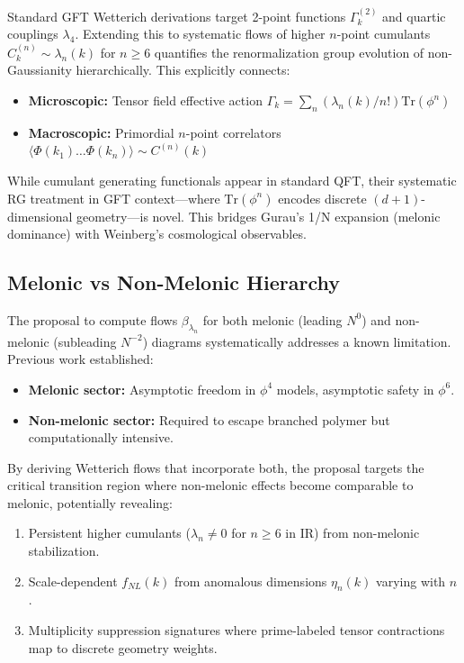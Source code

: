 \documentclass[12pt,a4paper]{article}
\begin{document}
Standard GFT Wetterich derivations target 2-point functions \(\Gamma_k^{(2)}\) and quartic couplings \(\lambda_4\). Extending this to systematic flows of higher \(n\)-point cumulants \(C_k^{(n)} \sim \lambda_n(k)\) for \(n \geq 6\) quantifies the renormalization group evolution of non-Gaussianity hierarchically. This explicitly connects:

\begin{itemize}
\item \textbf{Microscopic:} Tensor field effective action \(\Gamma_k = \sum_n (\lambda_n(k)/n!) \text{Tr}(\phi^n)\)
\item \textbf{Macroscopic:} Primordial \(n\)-point correlators \(\langle \Phi(k_1) \ldots \Phi(k_n) \rangle \sim C^{(n)}(k)\)
\end{itemize}

While cumulant generating functionals appear in standard QFT, their systematic RG treatment in GFT context—where \(\text{Tr}(\phi^n)\) encodes discrete \((d+1)\)-dimensional geometry—is novel. This bridges Gurau's 1/N expansion (melonic dominance) with Weinberg's cosmological observables.

\subsection{Melonic vs Non-Melonic Hierarchy}

The proposal to compute flows \(\beta_{\lambda_n}\) for both melonic (leading \(N^0\)) and non-melonic (subleading \(N^{-2}\)) diagrams systematically addresses a known limitation. Previous work established:

\begin{itemize}
\item \textbf{Melonic sector:} Asymptotic freedom in \(\phi^4\) models, asymptotic safety in \(\phi^6\).
\item \textbf{Non-melonic sector:} Required to escape branched polymer but computationally intensive.
\end{itemize}

By deriving Wetterich flows that incorporate both, the proposal targets the critical transition region where non-melonic effects become comparable to melonic, potentially revealing:

\begin{enumerate}
\item Persistent higher cumulants (\(\lambda_n \neq 0\) for \(n \geq 6\) in IR) from non-melonic stabilization.
\item Scale-dependent \(f_{NL}(k)\) from anomalous dimensions \(\eta_n(k)\) varying with \(n\).
\item Multiplicity suppression signatures where prime-labeled tensor contractions map to discrete geometry weights.
\end{enumerate}
\end{document}
